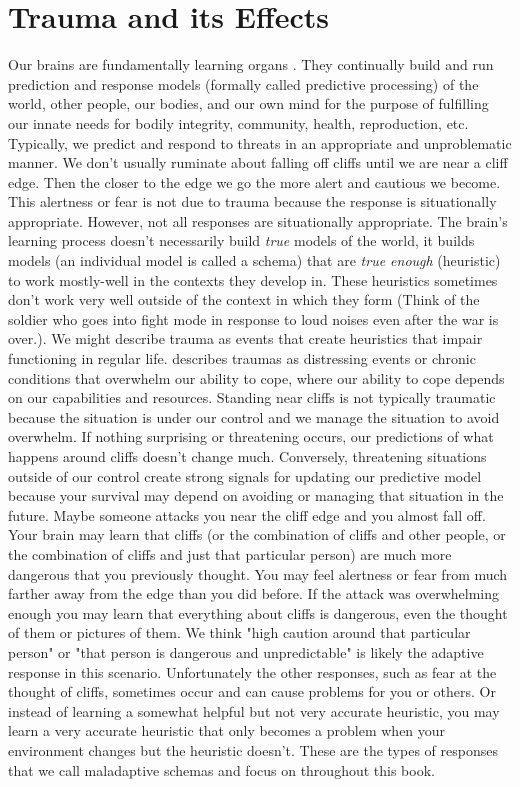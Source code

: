 \documentclass[12pt,letterpaper]{book}
\begin{document}
\section{Trauma and its Effects}
\label{sec:trauma}
Our brains are fundamentally learning organs \cite{clark2015surfing}. They continually build and run prediction and response models (formally called predictive processing) of the world, other people, our bodies, and our own mind for the purpose of fulfilling our innate needs for bodily integrity, community, health, reproduction, etc. Typically, we predict and respond to threats in an appropriate and unproblematic manner. We don't usually ruminate about falling off cliffs until we are near a cliff edge. Then the closer to the edge we go the more alert and cautious we become. This alertness or fear is not due to trauma because the response is situationally appropriate. However, not all responses are situationally appropriate. The brain's learning process doesn't necessarily build \textit{true} models of the world, it builds models (an individual model is called a schema) that are \textit{true enough} (heuristic) to work mostly-well in the contexts they develop in. These heuristics sometimes don't work very well outside of the context in which they form (Think of the soldier who goes into fight mode in response to loud noises even after the war is over.). We might describe trauma as events that create heuristics that impair functioning in regular life. \textcite{laneReconsolidation} describes traumas as distressing events or chronic conditions that overwhelm our ability to cope, where our ability to cope depends on our capabilities and resources. Standing near cliffs is not typically traumatic because the situation is under our control and we manage the situation to avoid overwhelm. If nothing surprising or threatening occurs, our predictions of what happens around cliffs doesn't change much. Conversely, threatening situations outside of our control create strong signals for updating our predictive model because your survival may depend on avoiding or managing that situation in the future. Maybe someone attacks you near the cliff edge and you almost fall off. Your brain may learn that cliffs (or the combination of cliffs and other people, or the combination of cliffs and just that particular person) are much more dangerous that you previously thought. You may feel alertness or fear from much farther away from the edge than you did before. If the attack was overwhelming enough you may learn that everything about cliffs is dangerous, even the thought of them or pictures of them. We think "high caution around that particular person" or "that person is dangerous and unpredictable" is likely the adaptive response in this scenario. Unfortunately the other responses, such as fear at the thought of cliffs, sometimes occur and can cause problems for you or others. Or instead of learning a somewhat helpful but not very accurate heuristic, you may learn a very accurate heuristic that only becomes a problem when your environment changes but the heuristic doesn't. These are the types of responses that we call maladaptive schemas and focus on throughout this book.
\end{document}
